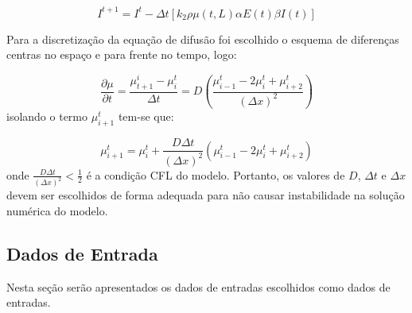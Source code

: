 \documentclass{article}
\begin{document}
\begin{equation}
	I^{t+1} = I^{t} - \Delta t \left[ k_2 \rho \mu(t,L) \alpha E(t) \beta I(t) \right]
\end{equation}

Para a discretização da equação de difusão foi escolhido o esquema de diferenças centras no espaço e para frente no tempo, logo:

\begin{equation}
	\frac{\partial \mu}{\partial t} = \frac{\mu_{t+1}^{i} - \mu_i^t}{\Delta t} = D \left( \frac{\mu_{i-1}^t - 2\mu_i^t + \mu_{i+2}^{t}}{( \Delta x)^2 } \right)
\end{equation}
isolando o termo $\mu_{i+1}^t$ tem-se que:

\begin{equation}
	\mu_{i+1}^t = \mu_i^t + \frac{D \Delta t}{(\Delta x)^2} \left( \mu_{i-1}^t - 2\mu_i^t + \mu_{i+2}^{t}  \right)
\end{equation}
onde $\frac{D\Delta t}{(\Delta x)^2} < \frac{1}{2}$ é a condição CFL do modelo. Portanto, os valores de $D$, $\Delta t$ e $\Delta x$ devem ser escolhidos de forma adequada para não causar instabilidade na solução numérica do modelo.

\subsection{Dados de Entrada}

Nesta seção serão apresentados os dados de entradas escolhidos como dados de entradas.
\end{document}
